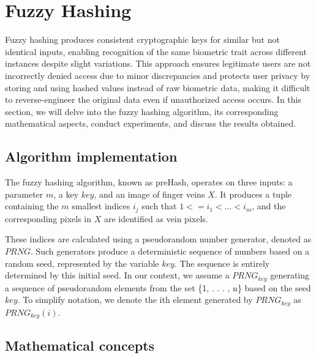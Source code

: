 \section{Fuzzy Hashing}
Fuzzy hashing produces consistent cryptographic keys for similar but not identical inputs, enabling recognition of the same biometric trait across different instances despite slight variations. This approach ensures legitimate users are not incorrectly denied access due to minor discrepancies and protects user privacy by storing and using hashed values instead of raw biometric data, making it difficult to reverse-engineer the original data even if unauthorized access occurs. 
In this section, we will delve into the fuzzy hashing algorithm, its corresponding mathematical aspects, conduct experiments, and discuss the results obtained.
\subsection{Algorithm implementation}


The fuzzy hashing algorithm, known as preHash, operates on three inputs: a parameter $m$, a key $key$, and an image of finger veins $X$. It produces a tuple containing the $m$ smallest indices $i_j$ such that $1 <= i_1 < ... < i_m$, and the corresponding pixels in $X$ are identified as vein pixels.

These indices are calculated using a pseudorandom number generator, denoted as $PRNG$. Such generators produce a deterministic sequence of numbers based on a random seed, represented by the variable $key$. The sequence is entirely determined by this initial seed. In our context, we assume a $PRNG_{key}$ generating a sequence of pseudorandom elements from the set \{1, . . . , n\} based on the seed $key$. To simplify notation, we denote the ith element generated by $PRNG_{key}$ as $PRNG_{key}(i)$.

\subsection{Mathematical concepts}

